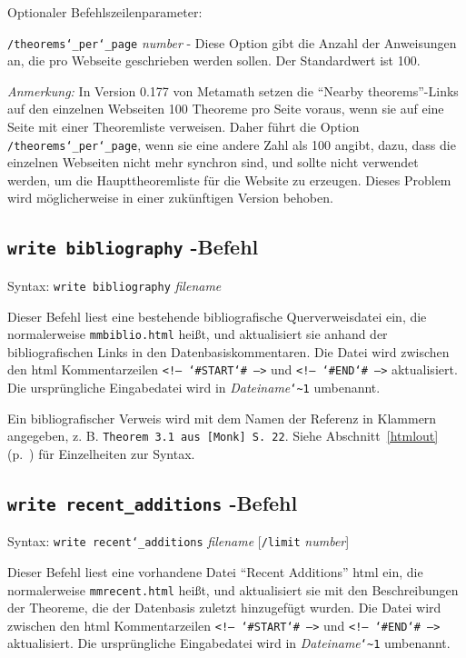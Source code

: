 Optionaler Befehlszeilenparameter:

    \texttt{/theorems{\char`\_}per{\char`\_}page} {\em number} - Diese Option gibt die Anzahl der Anweisungen an, die pro Webseite geschrieben werden sollen.  Der Standardwert ist 100.

{\em Anmerkung:} In Version 0.177 von Metamath setzen die "`Nearby theorems"'-Links auf den einzelnen Webseiten 100 Theoreme pro Seite voraus, wenn sie auf eine Seite mit einer Theoremliste verweisen.  Daher führt die Option \texttt{/theorems{\char`\_}per{\char`\_}page}, wenn sie eine andere Zahl als 100 angibt, dazu, dass die einzelnen Webseiten nicht mehr synchron sind, und sollte nicht verwendet werden, um die Haupttheoremliste für die Website zu erzeugen.  Dieses Problem wird möglicherweise in einer zukünftigen Version behoben.


\subsection{\texttt{write bibliography}\label{wrbib}
-Befehl}

Syntax:  \texttt{write bibliography} {\em filename}

Dieser Befehl liest eine bestehende bibliografische Querverweisdatei ein, die normalerweise \texttt{mmbiblio.html} heißt, und aktualisiert sie anhand der bibliografischen Links in den Datenbasiskommentaren.  Die Datei wird zwischen den {\sc html} Kommentarzeilen \texttt{<!-- {\char`\#}START{\char`\#} -->} und \texttt{<!-- {\char`\#}END{\char`\#} -->} aktualisiert.  Die ursprüngliche Eingabedatei wird in {\em Dateiname}\texttt{{\char`\~}1} umbenannt.

Ein bibliografischer Verweis wird mit dem Namen der Referenz in Klammern angegeben, z. B. \texttt{Theorem 3.1 aus [Monk] S.\ 22}. Siehe Abschnitt~\ref{htmlout} (p.~\pageref{htmlout}) für Einzelheiten zur Syntax.


\subsection{\texttt{write recent\_additions}
-Befehl}

Syntax:  \texttt{write recent{\char`\_}additions} {\em filename}
[\texttt{/limit} {\em number}]

Dieser Befehl liest eine vorhandene Datei "`Recent Additions"' {\sc html} ein, die normalerweise \texttt{mmrecent.html} heißt, und aktualisiert sie mit den Beschreibungen der Theoreme, die der Datenbasis zuletzt hinzugefügt wurden.  Die Datei wird zwischen den {\sc html} Kommentarzeilen \texttt{<!-- {\char`\#}START{\char`\#} -->} und \texttt{<!-- {\char`\#}END{\char`\#} -->} aktualisiert.  Die ursprüngliche Eingabedatei wird in {\em Dateiname}\texttt{{\char`\~}1} umbenannt.

